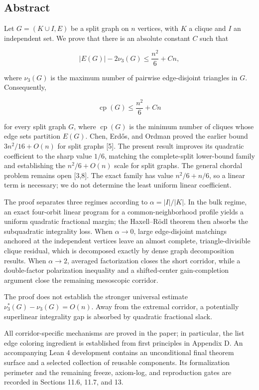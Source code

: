 \documentclass[
  american,
  11pt,
  a4paper,
]{article}
\begin{document}
\subsection{Abstract}\label{abstract}

Let \(G=(K\cup I,E)\) be a split graph on \(n\) vertices, with \(K\) a clique and \(I\) an independent set. We prove that there is an absolute constant \(C\) such that

\[
|E(G)|-2\nu_3(G)
\le
\frac{n^2}{6}+Cn,
\]

where \(\nu_3(G)\) is the maximum number of pairwise edge-disjoint triangles in \(G\). Consequently,

\[
\operatorname{cp}(G)
\le
\frac{n^2}{6}+Cn
\]

for every split graph \(G\), where \(\operatorname{cp}(G)\) is the minimum number of cliques whose edge sets partition \(E(G)\). Chen, Erdős, and Ordman proved the earlier bound \(3n^2/16+O(n)\) for split graphs {[}5{]}. The present result improves its quadratic coefficient to the sharp value \(1/6\), matching the complete-split lower-bound family and establishing the \(n^2/6+O(n)\) scale for split graphs. The general chordal problem remains open {[}3,8{]}. The exact family has value \(n^2/6+n/6\), so a linear term is necessary; we do not determine the least uniform linear coefficient.

The proof separates three regimes according to \(\alpha=|I|/|K|\). In the bulk regime, an exact four-orbit linear program for a common-neighborhood profile yields a uniform quadratic fractional margin; the Haxell--Rödl theorem then absorbs the subquadratic integrality loss. When \(\alpha\to0\), large edge-disjoint matchings anchored at the independent vertices leave an almost complete, triangle-divisible clique residual, which is decomposed exactly by dense graph decomposition results. When \(\alpha\to2\), averaged factorization closes the short corridor, while a double-factor polarization inequality and a shifted-center gain-completion argument close the remaining mesoscopic corridor.

The proof does not establish the stronger universal estimate \(\nu_3^*(G)-\nu_3(G)=O(n)\). Away from the extremal corridor, a potentially superlinear integrality gap is absorbed by quadratic fractional slack.

All corridor-specific mechanisms are proved in the paper; in particular, the list edge coloring ingredient is established from first principles in Appendix D. An accompanying Lean 4 development contains an unconditional final theorem surface and a selected collection of reusable components. Its formalization perimeter and the remaining freeze, axiom-log, and reproduction gates are recorded in Sections 11.6, 11.7, and 13.
\end{document}
